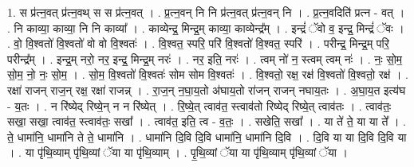 \documentclass[17pt]{extarticle}
\begin{document}
1. स प्र॑त्न॒वत् प्र॑त्न॒वथ् स स प्र॑त्न॒वत् । . प्र॒त्न॒वन् नि नि प्र॑त्न॒वत् प्र॑त्न॒वन् नि । . प्र॒त्न॒वदिति॑ प्रत्न - वत् । . नि काव्या॒ काव्या॒ नि नि काव्या᳚ । . काव्येन्द्र॒ मिन्द्र॒म् काव्या॒ काव्येन्द्र᳚म् । . इन्द्रं॑ ॅवो व॒ इन्द्र॒ मिन्द्रं॑ ॅवः । . वो॒ वि॒श्वतो॑ वि॒श्वतो॑ वो वो वि॒श्वतः॑ । . वि॒श्वत॒ स्परि॒ परि॑ वि॒श्वतो॑ वि॒श्वत॒ स्परि॑ । . परीन्द्र॒ मिन्द्र॒म् परि॒ परीन्द्र᳚म् । . इन्द्र॒म् नरो॒ नर॒ इन्द्र॒ मिन्द्र॒म् नरः॑ । . नर॒ इति॒ नरः॑ । . त्वम् नो॑ न॒ स्त्वम् त्वम् नः॑ । . नः॒ सो॒म॒ सो॒म॒ नो॒ नः॒ सो॒म॒ । . सो॒म॒ वि॒श्वतो॑ वि॒श्वतः॑ सोम सोम वि॒श्वतः॑ । . वि॒श्वतो॒ रक्ष॒ रक्ष॑ वि॒श्वतो॑ वि॒श्वतो॒ रक्ष॑ । . रक्षा॑ राजन् राज॒न् रक्ष॒ रक्षा॑ राजन्न् । . रा॒ज॒न् न॒घा॒य॒तो अ॑घाय॒तो रा॑जन् राजन् नघाय॒तः । . अ॒घा॒य॒त इत्य॑घ - य॒तः । . न रि॑ष्येद् रिष्ये॒न् न न रि॑ष्येत् । . रि॒ष्ये॒त् त्वाव॑त॒ स्त्वाव॑तो रिष्येद् रिष्ये॒त् त्वाव॑तः । . त्वाव॑तः॒ सखा॒ सखा॒ त्वाव॑त॒ स्त्वाव॑तः॒ सखा᳚ । . त्वाव॑त॒ इति॒ त्व - व॒तः॒ । . सखेति॒ सखा᳚ । . या ते॑ ते॒ या या ते᳚ । . ते॒ धामा॑नि॒ धामा॑नि ते ते॒ धामा॑नि । . धामा॑नि दि॒वि दि॒वि धामा॑नि॒ धामा॑नि दि॒वि । . दि॒वि या या दि॒वि दि॒वि या । . या पृ॑थि॒व्याम् पृ॑थि॒व्यां ॅया या पृ॑थि॒व्याम् । . पृ॒थि॒व्यां ॅया या पृ॑थि॒व्याम् पृ॑थि॒व्यां ॅया । \newline
\end{document}
